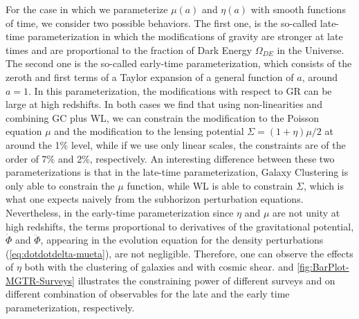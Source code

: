 For the case in which we parameterize $\mu(a)$ and $\eta(a)$ with smooth functions of time, we consider two possible behaviors. The first one, is the so-called
late-time parameterization in which the modifications of gravity are stronger at late times and are proportional to the fraction of Dark Energy
$\Omega_{DE}$ in the Universe. The second one is the so-called early-time parameterization, which consists of the zeroth and first terms of a Taylor expansion
of a general function of $a$, around $a=1$. In this parameterization, the modifications with respect to GR can be large at high redshifts.
In both cases we find that using non-linearities and combining GC plus WL, we can constrain the modification to the Poisson equation $\mu$
and the modification to the lensing potential $\Sigma=(1+\eta)\mu/2$ at around the 1\% level, while if we use only linear
scales, the constraints are of the order of 7\% and 2\%, respectively.
An interesting difference between these two parameterizations is that in the late-time parameterization, Galaxy Clustering is only able
to constrain the $\mu$ function, while WL is able to constrain $\Sigma$, which is what one expects naively from
the subhorizon perturbation equations. Nevertheless, in the early-time parameterization since $\eta$ and $\mu$ are not unity at high redshifts,
the terms proportional to derivatives of the gravitational potential, $\dot \Phi $ and $\ddot \Phi$, appearing in the evolution equation
for the density perturbations (\cref{eq:dotdotdelta-mueta}), are not negligible. Therefore, one can observe the effects of $\eta$ both with the clustering of galaxies 
and with cosmic shear.
 and \cref{fig:BarPlot-MGTR-Surveys} illustrates 
the constraining power of different surveys and on different combination of observables for the late and the early time parameterization, respectively.


